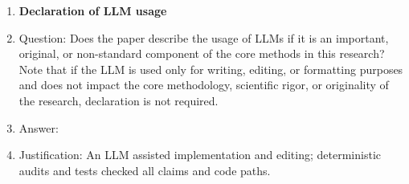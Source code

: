 \begin{enumerate}
\item {\bf Declaration of LLM usage}
    \enlargethispage{2\baselineskip}
    \item[] Question: Does the paper describe the usage of LLMs if it is an important, original, or non-standard component of the core methods in this research? Note that if the LLM is used only for writing, editing, or formatting purposes and does not impact the core methodology, scientific rigor, or originality of the research, declaration is not required.
    \item[] Answer: \answerYes{}
    \item[] Justification: An LLM assisted implementation and editing; deterministic audits and tests checked all claims and code paths.

\end{enumerate}
